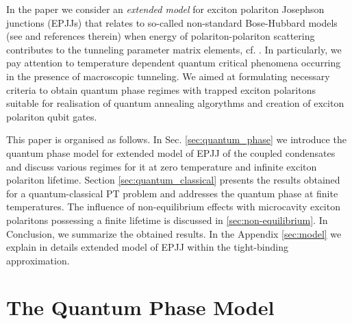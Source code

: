 \documentclass[aps, pre, preprint, groupedaddress, superscriptaddress, showkeys, showpacs] {revtex4-1}
\begin{document}
In the paper we consider an \textit{extended model} for exciton polariton Josephson junctions (EPJJs) that relates to so-called non-standard Bose-Hubbard models (see \cite{Dutta} and references therein) when energy of polariton-polariton scattering contributes to the tunneling parameter matrix elements, cf. \cite{Aleiner, Shelykh_2008, Borgh_2010, Solnyshkov_2008, Sarchi}.
In particularly, we pay attention to temperature dependent quantum critical phenomena occurring in the presence of macroscopic tunneling.
We aimed at formulating necessary criteria to obtain quantum phase regimes with trapped exciton polaritons suitable for realisation of quantum annealing algorythms and creation of exciton polariton qubit gates.

This paper is organised as follows.
In Sec. \ref{sec:quantum_phase} we introduce the quantum phase model for extended model of EPJJ of the coupled condensates and discuss various regimes for it at zero temperature and infinite exciton polariton lifetime.
Section \ref{sec:quantum_classical} presents the results obtained for a quantum-classical PT problem and addresses the quantum phase at finite temperatures.
The influence of non-equilibrium effects with microcavity exciton polaritons possessing a finite lifetime is discussed in \ref{sec:non-equilibrium}.      
In Conclusion, we summarize the obtained results.
In the Appendix \ref{sec:model} we explain in details  extended model of EPJJ within the tight-binding approximation.
 
\section{The Quantum Phase Model \label{sec:quantum_phase}}
\end{document}
